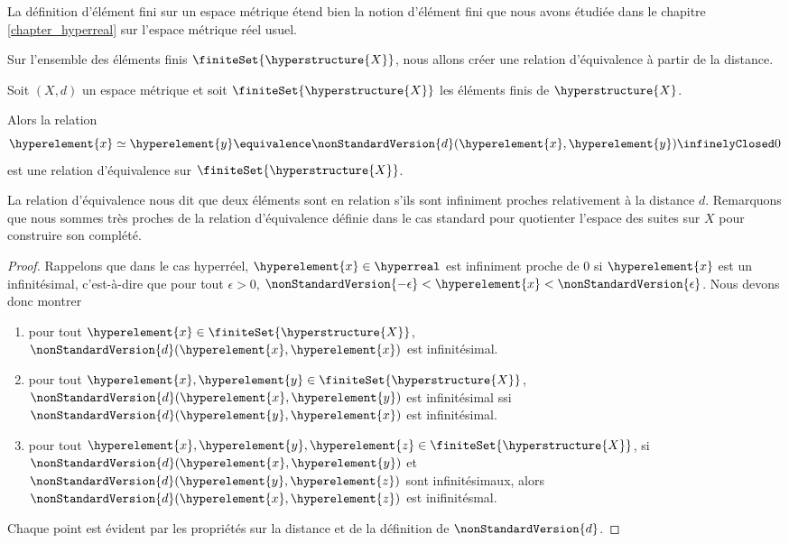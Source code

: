 \begin{remarque}
	La définition d'élément fini sur un espace métrique étend bien la notion
	d'élément fini que nous avons étudiée dans le chapitre
	\ref{chapter_hyperreal} sur l'espace métrique réel usuel.
\end{remarque}

Sur l'ensemble des éléments finis $\finiteSet{\hyperstructure{X}}$, nous allons
créer une relation d'équivalence à partir de la distance.

\begin{proposition}
	Soit $(X, d)$ un espace métrique et soit $\finiteSet{\hyperstructure{X}}$ les
	éléments finis de $\hyperstructure{X}$.

	Alors la relation
	\begin{equation}
		\hyperelement{x} \simeq \hyperelement{y} \equivalence
		\nonStandardVersion{d}(\hyperelement{x}, \hyperelement{y})
		\infinelyClosed 0
	\end{equation}
	est une relation d'équivalence sur $\finiteSet{\hyperstructure{X}}$.
\end{proposition}

La relation d'équivalence nous dit que deux éléments sont en relation s'ils sont
infiniment proches relativement à la distance $d$. Remarquons que nous sommes
très proches de la relation d'équivalence définie dans le cas standard pour
quotienter l'espace des suites sur $X$ pour construire son complété.

\ifdefined\outputproof
\begin{proof}
	Rappelons que dans le cas hyperréel, $\hyperelement{x} \in \hyperreal$ est
	infiniment proche de $0$ si $\hyperelement{x}$ est un infinitésimal,
	c'est-à-dire que pour tout $\epsilon > 0$, $\nonStandardVersion{-\epsilon} <
	\hyperelement{x} < \nonStandardVersion{\epsilon}$.
	Nous devons donc montrer
	\begin{enumerate}
		\item pour tout $\hyperelement{x} \in \finiteSet{\hyperstructure{X}}$,
			$\nonStandardVersion{d}(\hyperelement{x}, \hyperelement{x})$ est
			infinitésimal.
		\item pour tout $\hyperelement{x}, \hyperelement{y} \in
			\finiteSet{\hyperstructure{X}}$,
			$\nonStandardVersion{d}(\hyperelement{x}, \hyperelement{y})$ est
			infinitésimal ssi
			$\nonStandardVersion{d}(\hyperelement{y}, \hyperelement{x})$ est
			infinitésimal.
		\item pour tout $\hyperelement{x}, \hyperelement{y}, \hyperelement{z}
			\in \finiteSet{\hyperstructure{X}}$,
			si $\nonStandardVersion{d}(\hyperelement{x}, \hyperelement{y})$ et
			$\nonStandardVersion{d}(\hyperelement{y}, \hyperelement{z})$ sont
			infinitésimaux, alors $\nonStandardVersion{d}(\hyperelement{x},
			\hyperelement{z})$ est inifinitésmal.
	\end{enumerate}
	Chaque point est évident par les propriétés sur la distance et de la
	définition de $\nonStandardVersion{d}$.
\end{proof}
\fi

